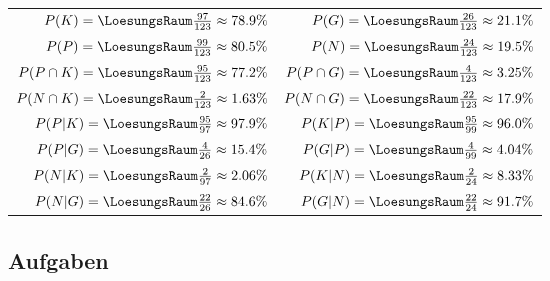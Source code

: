 \begin{tabular}{rr}
$P(K) = \LoesungsRaum{\frac{97}{123} \approx{} 78.9\%}$&
$P(G) = \LoesungsRaum{\frac{26}{123} \approx{} 21.1\%}$\\
$P(P) = \LoesungsRaum{\frac{99}{123} \approx{} 80.5\%}$&
$P(N) = \LoesungsRaum{\frac{24}{123} \approx{} 19.5\%}$\\


$P(P\cap K) = \LoesungsRaum{\frac{95}{123} \approx{} 77.2\%}$&
$P(P\cap G) = \LoesungsRaum{\frac{4}{123}  \approx{} 3.25\%}$\\
$P(N\cap K) = \LoesungsRaum{\frac{2}{123}  \approx{} 1.63\%}$&
$P(N\cap G) = \LoesungsRaum{\frac{22}{123} \approx{} 17.9\%}$\\

$P(P|K) = \LoesungsRaum{\frac{95}{97} \approx{} 97.9\%}$&
$P(K|P) = \LoesungsRaum{\frac{95}{99} \approx{} 96.0\%}$\\

$P(P|G) = \LoesungsRaum{\frac{4}{26} \approx{} 15.4\%}$&
$P(G|P) = \LoesungsRaum{\frac{4}{99} \approx{} 4.04\%}$\\

$P(N|K) = \LoesungsRaum{\frac{2}{97} \approx{} 2.06\%}$&
$P(K|N) = \LoesungsRaum{\frac{2}{24} \approx{} 8.33\%}$\\

$P(N|G) = \LoesungsRaum{\frac{22}{26} \approx{} 84.6\%}$&
$P(G|N) = \LoesungsRaum{\frac{22}{24} \approx{} 91.7\%}$\\
\end{tabular}
\newpage


\subsection*{Aufgaben}
\newpage
